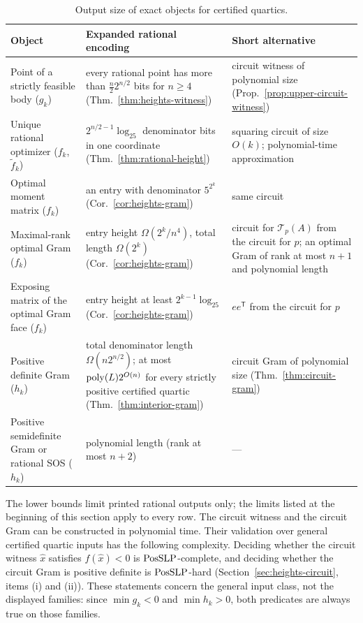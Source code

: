 \begin{table}[ht]
\centering
\small
\begin{tabularx}{\linewidth}{>{\raggedright\arraybackslash}X
  >{\raggedright\arraybackslash}X >{\raggedright\arraybackslash}X}
\toprule
Object & Expanded rational encoding & Short alternative\\
\midrule
Point of a strictly feasible body ($g_k$) &
every rational point has more than $\frac n2 2^{n/2}$ bits for $n\ge4$
(Thm.~\ref{thm:heights-witness}) &
circuit witness of polynomial size (Prop.~\ref{prop:upper-circuit-witness})\\
Unique rational optimizer ($f_k$, $\tilde f_k$) &
$2^{n/2-1}\log_25$ denominator bits in one coordinate
(Thm.~\ref{thm:rational-height}) &
squaring circuit of size $O(k)$; polynomial-time approximation\\
Optimal moment matrix ($f_k$) &
an entry with denominator $5^{2^k}$ (Cor.~\ref{cor:heights-gram}) &
same circuit\\
Maximal-rank optimal Gram ($f_k$) &
entry height $\Omega(2^k/n^4)$, total length $\Omega(2^k)$
(Cor.~\ref{cor:heights-gram}) &
circuit for $\mathcal T_p(A)$ from the circuit for $p$; an optimal Gram of
rank at most $n+1$ and polynomial length\\
Exposing matrix of the optimal Gram face ($f_k$) &
entry height at least $2^{k-1}\log_25$ (Cor.~\ref{cor:heights-gram}) &
$ee^{\mathsf T}$ from the circuit for $p$\\
Positive definite Gram ($h_k$) &
total denominator length $\Omega(n2^{n/2})$; at most $\operatorname{poly}(L)2^{O(n)}$ for
every strictly positive certified quartic (Thm.~\ref{thm:interior-gram}) &
circuit Gram of polynomial size (Thm.~\ref{thm:circuit-gram})\\
Positive semidefinite Gram or rational SOS ($h_k$) &
polynomial length (rank at most $n+2$) & ---\\
\bottomrule
\end{tabularx}
\caption{Output size of exact objects for certified quartics.}
\label{tab:heights-summary}
\end{table}

The lower bounds limit printed rational outputs only; the limits listed at
the beginning of this section apply to every row. The circuit witness and the
circuit Gram can be constructed in polynomial time. Their validation over
general certified quartic inputs has the following complexity. Deciding whether the circuit witness
$\hat x$ satisfies $f(\hat x)<0$ is $\mathrm{PosSLP}$-complete, and deciding whether
the circuit Gram is positive definite is $\mathrm{PosSLP}$-hard
(Section~\ref{sec:heights-circuit}, items (i) and (ii)). These statements
concern the general input class, not the displayed families: since
$\min g_k<0$ and $\min h_k>0$, both predicates are always true on those
families.
